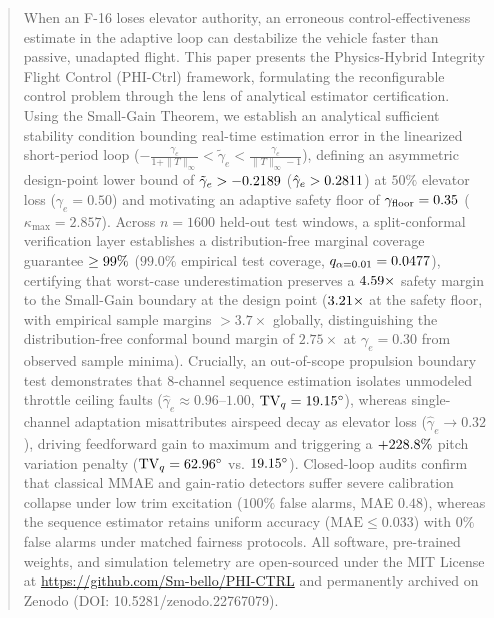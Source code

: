 \documentclass[review,12pt]{elsarticle}
\begin{document}
\begin{frontmatter}
\begin{abstract}
When an F-16 loses elevator authority, an erroneous control-effectiveness estimate in the adaptive loop can destabilize the vehicle faster than passive, unadapted flight. This paper presents the Physics-Hybrid Integrity Flight Control (PHI-Ctrl) framework, formulating the reconfigurable control problem through the lens of analytical estimator certification. Using the Small-Gain Theorem, we establish an analytical sufficient stability condition bounding real-time estimation error in the linearized short-period loop ($-\frac{\gamma_e}{1+\|T\|_\infty} < \tilde{\gamma}_e < \frac{\gamma_e}{\|T\|_\infty - 1}$), defining an asymmetric design-point lower bound of $\tilde{\gamma}_e > \SmallGainBoundNominal$ ($\hat{\gamma}_e > \SmallGainMinGammaHat$) at $50\%$ elevator loss ($\gamma_e = 0.50$) and motivating an adaptive safety floor of $\gamma_{\text{floor}} = \SafetyFloorVal$ ($\kappa_{\max} = 2.857$). Across $n = 1600$ held-out test windows, a split-conformal verification layer establishes a distribution-free marginal coverage guarantee $\ge \ConformalCoverage$ ($99.0\%$ empirical test coverage, $q_{\alpha=0.01} = \ConformalQuantile$), certifying that worst-case underestimation preserves a $\ConformalMarginDesignPoint$ safety margin to the Small-Gain boundary at the design point ($\ConformalMarginSafetyFloor$ at the safety floor, with empirical sample margins $>3.7\times$ globally, distinguishing the distribution-free conformal bound margin of $2.75\times$ at $\gamma_e = 0.30$ from observed sample minima). Crucially, an out-of-scope propulsion boundary test demonstrates that 8-channel sequence estimation isolates unmodeled throttle ceiling faults ($\hat{\gamma}_e \approx 0.96\text{--}1.00$, $\text{TV}_q = \TvQFullStackThrottle$), whereas single-channel adaptation misattributes airspeed decay as elevator loss ($\hat{\gamma}_e \to 0.32$), driving feedforward gain to maximum and triggering a $\TvQThrottleSpikePct$ pitch variation penalty ($\text{TV}_q = \TvQMisattrThrottle$ vs. $\TvQFullStackThrottle$). Closed-loop audits confirm that classical MMAE and gain-ratio detectors suffer severe calibration collapse under low trim excitation ($100\%$ false alarms, MAE $0.48$), whereas the sequence estimator retains uniform accuracy ($\text{MAE} \le 0.033$) with $0\%$ false alarms under matched fairness protocols. All software, pre-trained weights, and simulation telemetry are open-sourced under the MIT License at \url{https://github.com/Sm-bello/PHI-CTRL} and permanently archived on Zenodo (DOI: 10.5281/zenodo.22767079).
\end{abstract}


\end{frontmatter}
\end{document}
